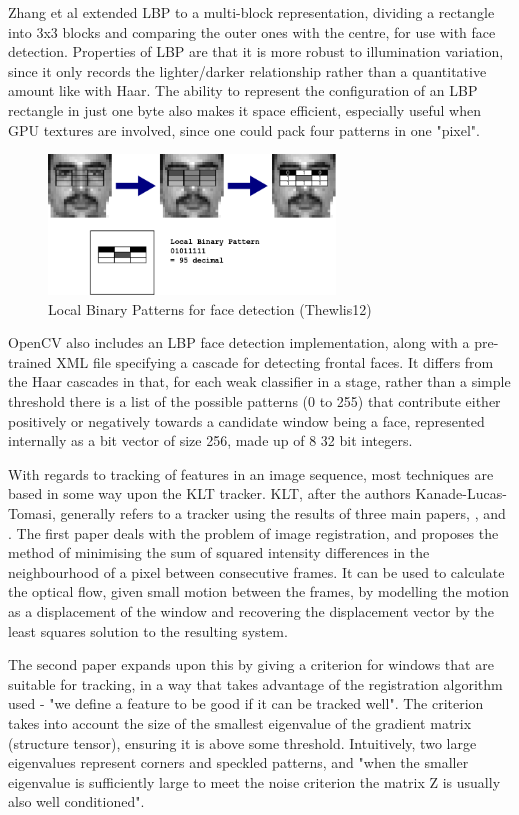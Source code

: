 \documentclass[a4paper]{article}
\begin{document}
Zhang et al extended LBP to a multi-block representation, dividing a rectangle into 3x3 blocks and comparing the outer ones with the centre, for use with face detection. Properties of LBP are that it is more robust to illumination variation, since it only records the lighter/darker relationship rather than a quantitative amount like with Haar. The ability to represent the configuration of an LBP rectangle in just one byte also makes it space efficient, especially useful when GPU textures are involved, since one could pack four patterns in one "pixel".

\begin{figure}
    \centering
    \includegraphics[width=3.0in]{lbp.png}
    \caption{Local Binary Patterns for face detection (Thewlis12)}
    \label{lbp}
\end{figure}

OpenCV also includes an LBP face detection implementation, along with a pre-trained XML file specifying a cascade for detecting frontal faces. It differs from the Haar cascades in that, for each weak classifier in a stage, rather than a simple threshold there is a list of the possible patterns (0 to 255) that contribute either positively or negatively towards a candidate window being a face, represented internally as a bit vector of size 256, made up of 8 32 bit integers.

With regards to tracking of features in an image sequence, most techniques are based in some way upon the KLT tracker. KLT, after the authors Kanade-Lucas-Tomasi, generally refers to a tracker using the results of three main papers, \cite{LucasKanade81}, \cite{TomasiKanade91} and \cite{ShiTomasi94}. The first paper deals with the problem of image registration, and proposes the method of minimising the sum of squared intensity differences in the neighbourhood of a pixel between consecutive frames. It can be used to calculate the optical flow, given small motion between the frames, by modelling the motion as a displacement of the window and recovering the displacement vector by the least squares solution to the resulting system.

The second paper expands upon this by giving a criterion for windows that are suitable for tracking, in a way that takes advantage of the registration algorithm used - "we define a feature to be good if it can be tracked well". The criterion takes into account the size of the smallest eigenvalue of the gradient matrix (structure tensor), ensuring it is above some threshold. Intuitively, two large eigenvalues represent corners and speckled patterns, and "when the smaller eigenvalue is sufficiently large to meet the noise criterion the matrix Z is usually also well conditioned". 
\end{document}
